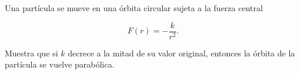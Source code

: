 \documentclass[../main.tex]{subfiles}
\begin{document}
\begin{problema}
	Una partícula se mueve en una órbita circular sujeta a la
	fuerza central

	\begin{equation}
		F(r) = -\dfrac{k}{r^{2}}.
	\end{equation}

	Muestra que si \(k\) decrece a la mitad de su valor original,
	entonces la órbita de la partícula se vuelve parabólica.
\end{problema}
\end{document}
